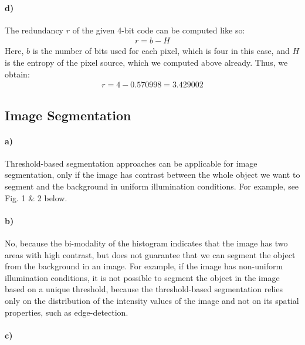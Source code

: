 \documentclass[a4paper,twocolumn]{article}
\begin{document}
	\paragraph{d)} %
	The redundancy $r$ of the given 4-bit code can be computed like so:
	\begin{align*}
	r = b - H
	\end{align*}
	Here, $b$ is the number of bits used for each pixel, which is four in this case, and $H$ is the entropy of the pixel source, which we computed above already. Thus, we obtain:
	\begin{align*}
		r = 4 - 0.570998 = 3.429002
	\end{align*}
	
	\subsection{Image Segmentation}
	
	\paragraph{a)} %
	Threshold-based segmentation approaches can be applicable for image segmentation, only if the image has contrast between the whole object we want to segment and the background in uniform illumination conditions. For example, see Fig. 1 \& 2 below.
	
	
	\paragraph{b)} %
	No, because the bi-modality of the histogram indicates that the image has two areas with high contrast, but does not guarantee that we can segment the object from the background in an image. For example, if the image has non-uniform illumination conditions, it is not possible to segment the object in the image based on a unique threshold, because the threshold-based segmentation relies only on the distribution of the intensity values of the image and not on its spatial properties, such as edge-detection.
	
	\paragraph{c)} %
	
\end{document}
